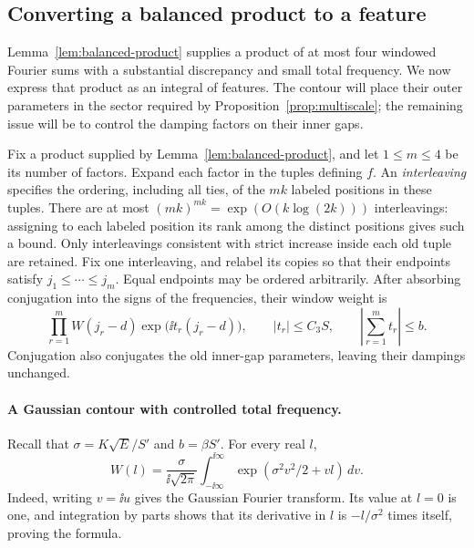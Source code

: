 \subsection{Converting a balanced product to a feature}
\label{subsec:contour-conversion}

Lemma~\ref{lem:balanced-product} supplies a product of at most four windowed
Fourier sums with a substantial discrepancy and small total frequency.
We now express that product as an integral of features. The contour will
place their outer parameters in the sector required by
Proposition~\ref{prop:multiscale}; the remaining issue will be to control
the damping factors on their inner gaps.

Fix a product supplied by Lemma~\ref{lem:balanced-product}, and let
$1\le m\le4$ be its number of factors. Expand each factor in the tuples
defining $f$. An \emph{interleaving} specifies the ordering, including all
ties, of the $mk$ labeled positions in these tuples. There are at most
$(mk)^{mk}=\exp(O(k\log(2k)))$ interleavings: assigning to each labeled
position its rank among the distinct positions gives such a bound.
Only interleavings consistent with strict increase inside each old tuple
are retained. Fix one interleaving, and relabel its copies so that their
endpoints satisfy $j_1\le\cdots\le j_m$. Equal endpoints may be ordered
arbitrarily. After absorbing conjugation into the signs of the
frequencies, their window weight is
\begin{equation}
 \prod_{r=1}^m W(j_r-d)\exp\bigl(\ii t_r(j_r-d)\bigr),
 \qquad |t_r|\le C_3S,\qquad
 \left|\sum_{r=1}^m t_r\right|\le b.
 \label{eq:endpoint-window}
\end{equation}
Conjugation also conjugates the old inner-gap parameters, leaving their
dampings unchanged.

\paragraph{A Gaussian contour with controlled total frequency.}
Recall that $\sigma=K\sqrt E/S'$ and $b=\beta S'$. For every real $l$,
\begin{equation}
 W(l)=\frac{\sigma}{\ii\sqrt{2\pi}}
       \int_{-\ii\infty}^{\ii\infty}
       \exp(\sigma^2v^2/2+vl)\,dv.
 \label{eq:gaussian-contour}
\end{equation}
Indeed, writing $v=\ii u$ gives the Gaussian Fourier transform. Its value
at $l=0$ is one, and integration by parts shows that its derivative in
$l$ is $-l/\sigma^2$ times itself, proving the formula.

